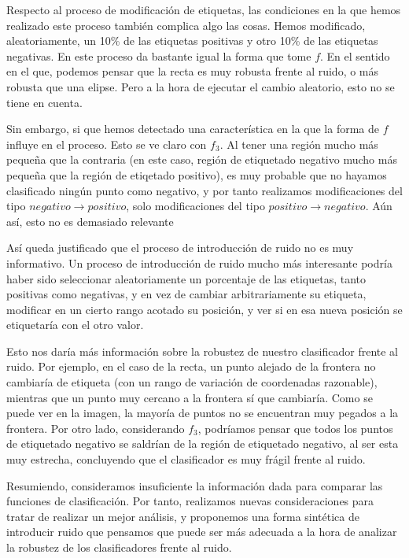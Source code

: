 \documentclass[11pt]{article}
\begin{document}
Respecto al proceso de modificación de etiquetas, las condiciones en la que hemos realizado este proceso también complica algo las cosas. Hemos modificado, aleatoriamente, un 10\% de las etiquetas positivas y otro 10\% de las etiquetas negativas. En este proceso da bastante igual la forma que tome $f$. En el sentido en el que, podemos pensar que la recta es muy robusta frente al ruido, o más robusta que una elipse. Pero a la hora de ejecutar el cambio aleatorio, esto no se tiene en cuenta.

Sin embargo, si que hemos detectado una característica en la que la forma de $f$ influye en el proceso. Esto se ve claro con $f_3$. Al tener una región mucho más pequeña que la contraria (en este caso, región de etiquetado negativo mucho más pequeña que la región de etiqetado positivo), es muy probable que no hayamos clasificado ningún punto como negativo, y por tanto realizamos modificaciones del tipo $negativo \rightarrow positivo$, solo modificaciones del tipo $positivo \rightarrow negativo$. Aún así, esto no es demasiado relevante

Así queda justificado que el proceso de introducción de ruido no es muy informativo. Un proceso de introducción de ruido mucho más interesante podría haber sido seleccionar aleatoriamente un porcentaje de las etiquetas, tanto positivas como negativas, y en vez de cambiar arbitrariamente su etiqueta, modificar en un cierto rango acotado su posición, y ver si en esa nueva posición se etiquetaría con el otro valor.

Esto nos daría más información sobre la robustez de nuestro clasificador frente al ruido. Por ejemplo, en el caso de la recta, un punto alejado de la frontera no cambiaría de etiqueta (con un rango de variación de coordenadas razonable), mientras que un punto muy cercano a la frontera sí que cambiaría. Como se puede ver en la imagen, la mayoría de puntos no se encuentran muy pegados a la frontera. Por otro lado, considerando $f_3$, podríamos pensar que todos los puntos de etiquetado negativo se saldrían de la región de etiquetado negativo, al ser esta muy estrecha, concluyendo que el clasificador es muy frágil frente al ruido.

Resumiendo, consideramos insuficiente la información dada para comparar las funciones de clasificación. Por tanto, realizamos nuevas consideraciones para tratar de realizar un mejor análisis, y proponemos una forma sintética de introducir ruido que pensamos que puede ser más adecuada a la hora de analizar la robustez de los clasificadores frente al ruido.



\pagebreak




\end{document}
